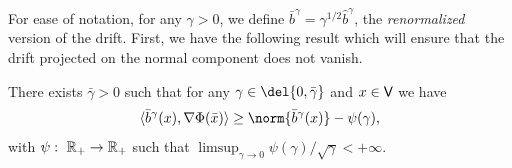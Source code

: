 For ease of notation, for any $\gamma >0$, we define $\bar{b}^\gamma = \gamma^{1/2} \hat{b}^\gamma$, the \emph{renormalized} version of the drift.
First, we have the following result which will ensure that the drift projected on the normal component does not vanish.

\begin{lemma}
	\label{lemma:complement_computation}
	There exists $\bar{\gamma} > 0$ such that for any $\gamma \in \del{0, \bar{\gamma}}$ and $x \in \sf{V}$ we have \begin{equation} \langle \bar{b}^\gamma(x), \nabla \Phi(\bar{x}) \rangle \geq \norm{\bar{b}^\gamma(x)} - \psi(\gamma) , \end{equation} with $\psi: \ \mathbb{R}_+ \to \mathbb{R}_+$ such that $\limsup_{\gamma \to 0} \psi(\gamma)/\sqrt{\gamma} <+\infty$.
\end{lemma}

